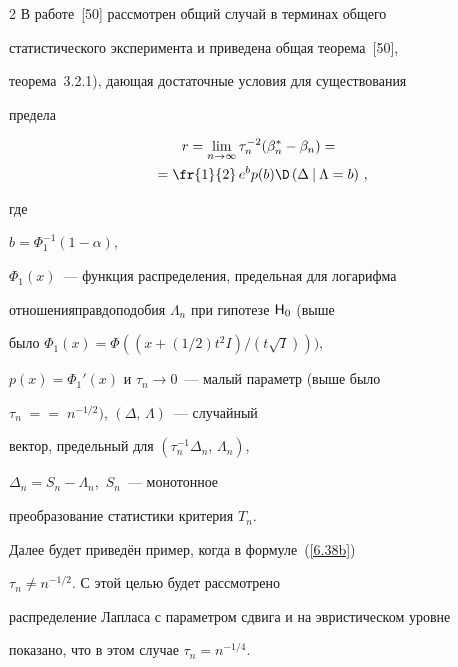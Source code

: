 \begin{multicols}{2}
В работе~[50] рассмотрен общий случай в терминах общего


статистического эксперимента и приведена общая теорема~[50],


теорема~3.2.1), дающая достаточные условия для существования


предела


\begin{multline}


r = \lim_{n\to\infty}\tau_n^{-2}(\beta_n^* -


\beta_n) ={}\\


{}= \fr{1}{2}\,e^bp(b){\D}\left (\Delta\:|\:\Lambda = b\right )\,,


\label{6.38b}


\end{multline}


где


$b = \Phi_1^{-1}(1-\alpha)$,


$\Phi_1(x)$~--- функция распре\-де\-ления, предельная для логарифма


отношения\linebreak правдоподобия $\Lambda_n$ при гипотезе ${\sf H}_0$ (выше


было $\Phi_1(x)=\Phi((x+(1/2)t^2I)/(t\sqrt{I})))$,


$p(x) = \Phi_1'(x)$ и $\tau_n\to 0$~--- малый параметр (выше было


$\tau_n\;=$\linebreak $=\;n^{-1/2})$, $(\Delta,\,\Lambda)$~--- случайный


вектор, предельный для $(\tau_n^{-1}\Delta_n,\,\Lambda_n)$,\


$\Delta_n = S_n - \Lambda_n$,\  $S_n$~--- монотонное


преобразование статистики критерия $T_n$.





Далее  будет приведён пример, когда в формуле~(\ref{6.38b})


$\tau_n\ne n^{-1/2}$. С этой целью будет рассмотрено


распределение Лапласа с параметром сдвига и на эвристическом уровне


показано, что в этом случае $\tau_n = n^{-1/4}$.





\vspace*{-6pt}






\end{multicols}
